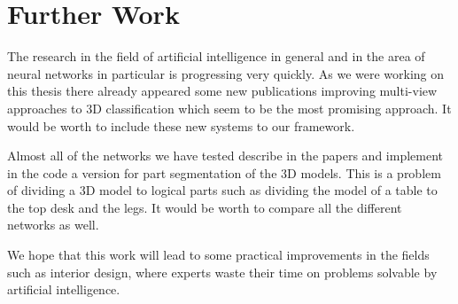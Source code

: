 \section{Further Work}
The research in the field of artificial intelligence in general and in the area of neural networks in particular is progressing very quickly. As we were working on this thesis there already appeared some new publications \cite{yu_multi-view_2018, you_pvnet:_2018, feng_gvcnn:_2018} improving multi-view approaches to 3D classification which seem to be the most promising approach. It would be worth to include these new systems to our framework. \par
Almost all of the networks we have tested describe in the papers and implement in the code a version for part segmentation of the 3D models. This is a problem of dividing a 3D model to logical parts such as dividing the model of a table to the top desk and the legs. It would be worth to compare all the different networks as well.\par
We hope that this work will lead to some practical improvements in the fields such as interior design, where experts waste their time on problems solvable by artificial intelligence. 
